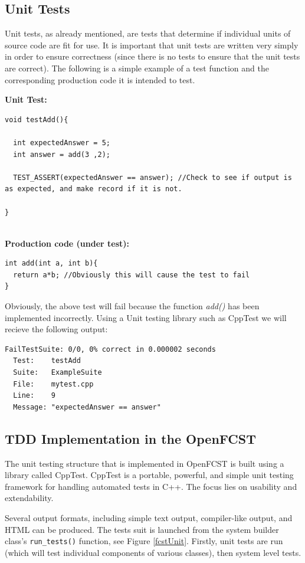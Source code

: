 \subsection{Unit Tests}
Unit tests, as already mentioned, are tests that determine if individual units of source code are fit for use. It is important that unit tests are written very simply in order to ensure correctness (since there is no tests to ensure that the unit tests are correct). The following is a simple example of a test function and the corresponding production code it is intended to test.
      
\textbf{Unit Test:}
\begin{lstlisting}
void testAdd(){
  
  int expectedAnswer = 5;
  int answer = add(3 ,2);
  
  TEST_ASSERT(expectedAnswer == answer); //Check to see if output is as expected, and make record if it is not.
  
}
      
\end{lstlisting}
      
      \textbf{Production code (under test):}
      \begin{lstlisting}
int add(int a, int b){
  return a*b; //Obviously this will cause the test to fail
}
      \end{lstlisting}
      
      Obviously, the above test will fail because the function \emph{add()} has been implemented incorrectly. Using a Unit testing library such as CppTest we will recieve the following output:
      
      \begin{lstlisting}
FailTestSuite: 0/0, 0% correct in 0.000002 seconds
  Test:    testAdd
  Suite:   ExampleSuite
  File:    mytest.cpp
  Line:    9
  Message: "expectedAnswer == answer"
      \end{lstlisting}

\subsection{TDD Implementation in the OpenFCST}  
The unit testing structure that is implemented in OpenFCST is built using a library called CppTest.  CppTest is a portable, powerful, and simple unit testing framework for handling automated tests in C++. The focus lies on usability and extendability.

Several output formats, including simple text output, compiler-like output, and HTML can be produced. The tests suit is launched from the system builder class's \texttt{run\_tests()} function, see Figure \ref{fcstUnit}. Firstly, unit tests are run (which will test individual components of various classes), then system level tests. 
      
